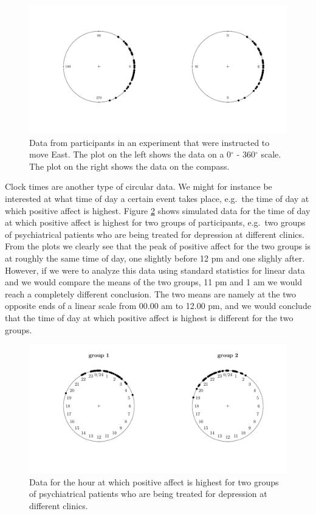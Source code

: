 \documentclass[11pt,]{article}
\begin{document}
\begin{figure}
        \centering

\includegraphics[width=\textwidth]{plotdir.pdf}

         \caption{Data from participants in an experiment that were instructed to move East. The plot on the left shows the data on a 0$^\circ$ - 360$^\circ$ scale. The plot on the right shows the data on the compass.}
        \label{plotdir}
\end{figure}

Clock times are another type of circular data. We might for instance be
interested at what time of day a certain event takes place, e.g.~the
time of day at which positive affect is highest. Figure \ref{plothour}
shows simulated data for the time of day at which positive affect is
highest for two groups of participants, e.g.~two groups of psychiatrical
patients who are being treated for depression at different clinics. From
the plots we clearly see that the peak of positive affect for the two
groups is at roughly the same time of day, one slightly before 12 pm and
one slighly after. However, if we were to analyze this data using
standard statistics for linear data and we would compare the means of
the two groups, 11 pm and 1 am we would reach a completely different
conclusion. The two means are namely at the two opposite ends of a
linear scale from 00.00 am to 12.00 pm, and we would conclude that the
time of day at which positive affect is highest is different for the two
groups.

\begin{figure}
        \centering

\includegraphics[width=\textwidth]{plothour.pdf}

         \caption{Data for the hour at which positive affect is highest for two groups of
psychiatrical patients who are being treated for depression at different
clinics.}
        \label{plothour}
\end{figure}
\end{document}
